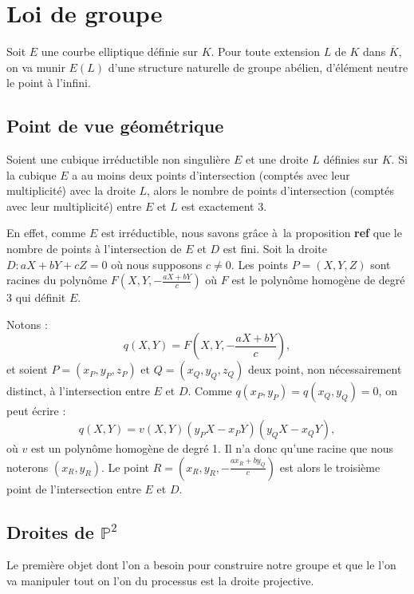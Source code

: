 \chapter{Loi de groupe}

Soit $E$ une courbe elliptique définie sur $K$. Pour toute extension $L$ de $K$ dans $\overline{K}$, on va munir $E(L)$ d'une structure naturelle de groupe abélien, d'élément neutre le point à l'infini.

\section{Point de vue géométrique}

\begin{proposition}
    \label{prop:secTanGeo}
    
    Soient une cubique irréductible non singulière $E$ et une droite $L$ définies sur
    $K$. Si la cubique $E$ a au moins deux points d'intersection (comptés avec leur
    multiplicité) avec la droite $L$, alors le nombre de points d'intersection (comptés avec
    leur multiplicité) entre $E$ et $L$ est exactement $3$.
\end{proposition}

\begin{demonstration}
   En effet, comme $E$ est irréductible, nous savons grâce à la proposition \textbf{ref} que le
   nombre de points à l'intersection de $E$ et $D$ est fini. Soit la droite $D : aX + bY + cZ =
   0$ où nous supposons $c \neq 0$. Les points $P = (X,Y,Z)$ sont racines du polynôme $F(X,Y,-
   \frac{aX+bY}{c})$ où $F$ est le polynôme homogène de degré 3 qui définit $E$. 

   Notons :
   \[
   q(X,Y)=F(X,Y,- \frac{aX + bY}{c})
   ,\] 
   et soient $P=(x_{P},y_{P},z_{P})$ et $Q=(x_{Q},y_{Q},z_{Q})$ deux point, non nécessairement
   distinct, à l'intersection
   entre $E$ et $D$. Comme $q(x_{P},y_{P}) = q(x_{Q},y_{Q})=0$, on peut écrire : 
   \[
   q(X,Y)=v(X,Y)(y_{P}X-x_{P}Y)(y_{Q}X-x_{Q}Y)
   ,\] 
   où $v$ est un polynôme homogène de degré 1. Il n'a donc qu'une racine que nous noterons
   $(x_{R},y_{R})$. Le point $R=(x_{R},y_{R},- \frac{ax_{R}+by_{Q}}{c})$ est alors le troisième
   point de l'intersection entre $E$ et $D$.
\end{demonstration}

\section{Droites de $\mathbb{P}^2$}
Le première objet dont l'on a besoin pour construire notre groupe et que le l'on va
manipuler tout on l'on du processus est la droite projective.

